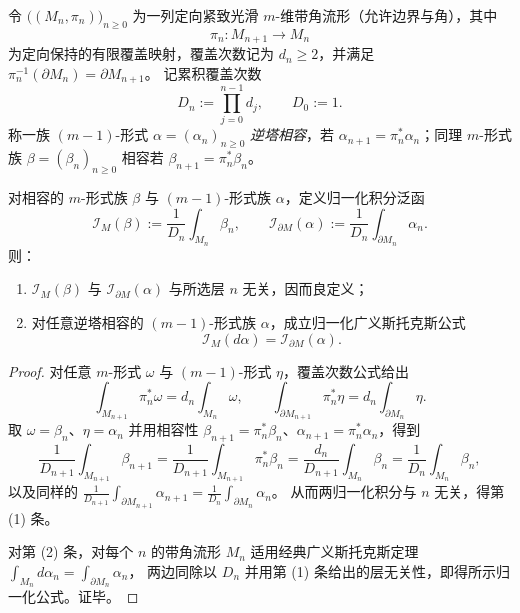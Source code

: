 \begin{theorem}[有限覆盖逆塔的归一化广义斯托克斯公式]\label{thm:app-normalized-stokes-finite-cover-inverse-tower}
令 \(\bigl((M_n,\pi_n)\bigr)_{n\ge 0}\) 为一列定向紧致光滑 \(m\)-维带角流形（允许边界与角），其中
\[
\pi_n:M_{n+1}\to M_n
\]
为定向保持的有限覆盖映射，覆盖次数记为 \(d_n\ge 2\)，并满足 \(\pi_n^{-1}(\partial M_n)=\partial M_{n+1}\)。
记累积覆盖次数
\[
D_n:=\prod_{j=0}^{n-1}d_j,\qquad D_0:=1.
\]
称一族 \((m-1)\)-形式 \(\alpha=(\alpha_n)_{n\ge 0}\) \emph{逆塔相容}，若 \(\alpha_{n+1}=\pi_n^\ast\alpha_n\)；同理 \(m\)-形式族 \(\beta=(\beta_n)_{n\ge 0}\) 相容若 \(\beta_{n+1}=\pi_n^\ast\beta_n\)。

对相容的 \(m\)-形式族 \(\beta\) 与 \((m-1)\)-形式族 \(\alpha\)，定义归一化积分泛函
\[
\mathcal I_M(\beta):=\frac1{D_n}\int_{M_n}\beta_n,\qquad
\mathcal I_{\partial M}(\alpha):=\frac1{D_n}\int_{\partial M_n}\alpha_n.
\]
则：
\begin{enumerate}
  \item \(\mathcal I_M(\beta)\) 与 \(\mathcal I_{\partial M}(\alpha)\) 与所选层 \(n\) 无关，因而良定义；
  \item 对任意逆塔相容的 \((m-1)\)-形式族 \(\alpha\)，成立归一化广义斯托克斯公式
  \[
  \mathcal I_M(d\alpha)=\mathcal I_{\partial M}(\alpha).
  \]
\end{enumerate}
\end{theorem}

\begin{proof}
对任意 \(m\)-形式 \(\omega\) 与 \((m-1)\)-形式 \(\eta\)，覆盖次数公式给出
\[
\int_{M_{n+1}}\pi_n^\ast\omega=d_n\int_{M_n}\omega,
\qquad
\int_{\partial M_{n+1}}\pi_n^\ast\eta=d_n\int_{\partial M_n}\eta.
\]
取 \(\omega=\beta_n\)、\(\eta=\alpha_n\) 并用相容性 \(\beta_{n+1}=\pi_n^\ast\beta_n\)、\(\alpha_{n+1}=\pi_n^\ast\alpha_n\)，得到
\[
\frac1{D_{n+1}}\int_{M_{n+1}}\beta_{n+1}
=\frac1{D_{n+1}}\int_{M_{n+1}}\pi_n^\ast\beta_n
=\frac{d_n}{D_{n+1}}\int_{M_n}\beta_n
=\frac1{D_n}\int_{M_n}\beta_n,
\]
以及同样的
\(
\frac1{D_{n+1}}\int_{\partial M_{n+1}}\alpha_{n+1}
=\frac1{D_n}\int_{\partial M_n}\alpha_n
\)。
从而两归一化积分与 \(n\) 无关，得第 (1) 条。

对第 (2) 条，对每个 \(n\) 的带角流形 \(M_n\) 适用经典广义斯托克斯定理
\(
\int_{M_n}d\alpha_n=\int_{\partial M_n}\alpha_n
\)，
两边同除以 \(D_n\) 并用第 (1) 条给出的层无关性，即得所示归一化公式。证毕。
\end{proof}


